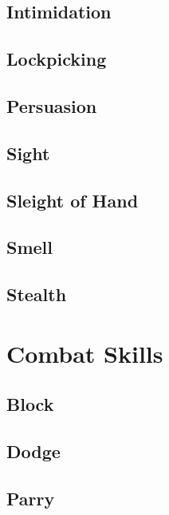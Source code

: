 \subsection{Intimidation}\label{skill:intimidation}

\subsection{Lockpicking}\label{skill:lockpicking}

\subsection{Persuasion}\label{skill:persuasion}

\subsection{Sight}\label{skill:sight}

\subsection{Sleight of Hand}\label{skill:sleight-of-hand}

\subsection{Smell}\label{skill:smell}

\subsection{Stealth}\label{skill:stealth}

\section{Combat Skills}

\subsection{Block}\label{skill:block}

\subsection{Dodge}\label{skill:dodge}

\subsection{Parry}\label{skill:parry}

